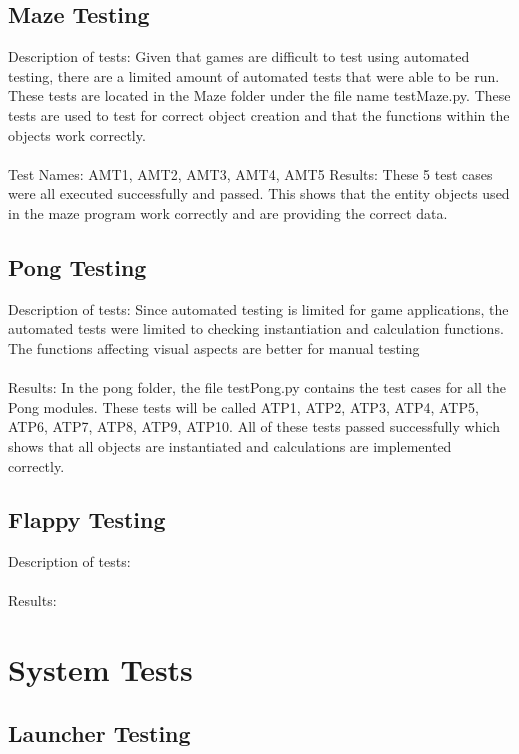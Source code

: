 \documentclass[12pt, titlepage]{article}
\begin{document}
	\subsection{Maze Testing}
		Description of tests: Given that games are difficult to test using automated testing, there are a limited amount of automated tests that were able to be run. These tests are located in the Maze folder under the file name testMaze.py. These tests are used to test for correct object creation and that the functions within the objects work correctly. \\ \\
		Test Names: AMT1, AMT2, AMT3, AMT4, AMT5
		Results: These 5 test cases were all executed successfully and passed. This shows that the entity objects used in the maze program work correctly and are providing the correct data.\\ 
		
	\subsection{Pong Testing}
		Description of tests: Since automated testing is limited for game applications, the automated tests were limited to checking instantiation and calculation functions. The functions affecting visual aspects are better for manual testing\\ \\
		Results: In the pong folder, the file testPong.py contains the test cases for all the Pong modules. These tests will be called ATP1, ATP2, ATP3, ATP4, ATP5, ATP6, ATP7, ATP8, ATP9, ATP10. All of these tests passed successfully which shows that all objects are instantiated and calculations are implemented correctly. \\ 
		
	\subsection{Flappy Testing}
		Description of tests: \\ \\
		Results: \\ 
		
\section{System Tests}

\subsection{Launcher Testing}
\end{document}
